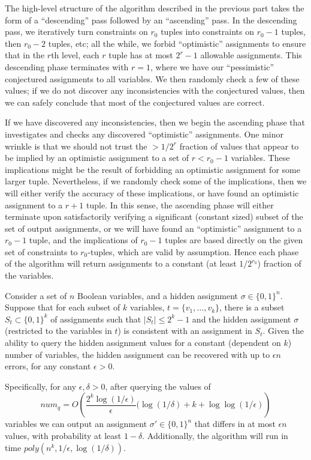 \documentclass[anon,12pt]{colt2018}
\newcommand{\eps}{\epsilon}
\begin{document}
The high-level structure of the algorithm described in the previous part takes the form of a ``descending'' pass followed by an ``ascending'' pass.  In the descending pass,  we iteratively turn constraints on $r_0$ tuples into constraints on $r_0-1$ tuples, then $r_0-2$ tuples, etc; all the while, we forbid ``optimistic'' assignments to ensure that in the $r$th level, each $r$ tuple has at most $2^{r}-1$ allowable assignments.   This descending phase terminates with $r=1$, where we have our ``pessimistic'' conjectured assignments to all variables.  We then randomly check a few of these values; if we do not discover any inconsistencies with the conjectured values, then we can safely conclude that most of the conjectured values are correct.  

If we have discovered any inconsistencies, then we begin the ascending phase that investigates and checks any discovered ``optimistic'' assignments.  One minor wrinkle is that we should not trust the $>1/2^{r}$ fraction of values that appear to be implied by an  optimistic assignment to a set of $r < r_0-1$ variables.  These implications might be the result of forbidding an optimistic assignment for some larger tuple.  Nevertheless, if we randomly check some of the implications, then we will either verify the accuracy of these implications, or have found an optimistic assignment to a $r+1$ tuple.  In this sense, the ascending phase will either terminate upon satisfactorily verifying a significant (constant sized) subset of the set of output assignments, or we will have found an ``optimistic'' assignment to a  $r_0-1$ tuple, and the implications of $r_0-1$ tuples are based directly on the given set of constraints to $r_0$-tuples, which are valid by assumption.  Hence each phase of the algorithm will return assignments to a constant (at least $1/2^{r_0}$) fraction of the variables.



\iffalse

\begin{theorem}
Consider a set of $n$ Boolean variables, and a hidden assignment $\sigma\in \{0,1\}^n.$  Suppose that for each subset of $k$ variables, $t=\{v_1,\ldots,v_k\}$, there is a subset $S_t \subset \{0,1\}^k$ of assignments such that $|S_t| \le 2^k -1$ and the hidden assignment $\sigma$ (restricted to the variables in $t$) is consistent with an assignment in $S_t$.  Given the ability to query the hidden assignment values for a constant (dependent on $k$) number of variables, the hidden assignment can be recovered with up to $\eps n$ errors, for any constant $\eps>0$.  

Specifically, for any $\eps,\delta>0$,  after querying the values of $$num_q = O\left(\frac{2^k \log(1/\eps)}{\eps}(\log(1/\delta)+k+\log\log(1/\eps) \right)$$ variables we can output an assignment $\sigma' \in \{0,1\}^n$ that differs in at most $\eps n$ values, with probability at least $1-\delta.$  Additionally, the algorithm will run in time $poly(n^k,1/\eps,\log(1/\delta)).$
\end{theorem}
\end{document}
